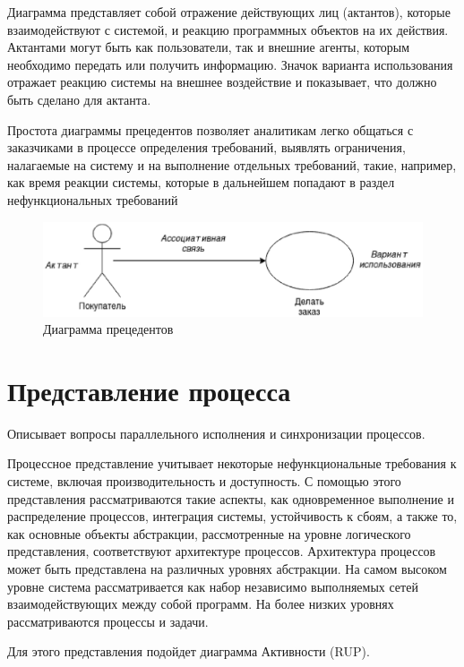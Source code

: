 Диаграмма представляет собой отражение действующих лиц (актантов), которые взаимодействуют с системой, и реакцию программных объектов на их действия. Актантами могут быть как пользователи, так и внешние агенты, которым необходимо передать или получить информацию. Значок варианта использования отражает реакцию системы на внешнее воздействие и показывает, что должно быть сделано для актанта.

Простота диаграммы прецедентов позволяет аналитикам легко общаться с заказчиками в процессе определения требований, выявлять ограничения, налагаемые на систему и на выполнение отдельных требований, такие, например, как время реакции системы, которые в дальнейшем попадают в раздел нефункциональных требований

\begin{figure}[h!]
        \centering
        \includegraphics[width=\textwidth]{images/4/1.eps}
        \caption{Диаграмма прецедентов}
        \label{uml}
\end{figure}

\section{Представление процесса}

Описывает вопросы параллельного исполнения и синхронизации процессов.

Процессное представление учитывает некоторые нефункциональные требования к системе, включая производительность и доступность. С помощью этого представления рассматриваются такие аспекты, как одновременное выполнение и распределение процессов, интеграция системы, устойчивость к сбоям, а также то, как основные объекты абстракции, рассмотренные на уровне логического представления, соответствуют архитектуре процессов. Архитектура процессов может быть представлена на различных уровнях абстракции. На самом высоком уровне система рассматривается как набор независимо выполняемых сетей взаимодействующих между собой программ. На более низких уровнях рассматриваются процессы и задачи.

Для этого представления подойдет диаграмма Активности (RUP).

